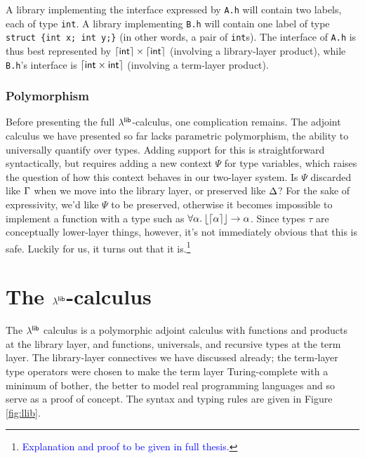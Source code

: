 \documentclass[11pt]{article}
\newcommand{\bscolor}{blue}
\newcommand{\bs}[1]{\textcolor{\bscolor}{#1}}
\begin{document}
A library implementing the interface expressed by \texttt{A.h} will contain two
labels, each of type \texttt{int}. A library implementing \texttt{B.h} will
contain one label of type \texttt{struct \{int x; int y;\}} (in other words, a
pair of \texttt{int}s). The interface of \texttt{A.h} is thus best represented
by $\lceil{\ensuremath{\textsf{int}}}\rceil \times \lceil{\ensuremath{\textsf{int}}}\rceil$ (involving a library-layer product), while
\texttt{B.h}'s interface is $\lceil{\ensuremath{\textsf{int}} \times\ensuremath{\textsf{int}}}\rceil$ (involving a term-layer
product).


\subsubsection{Polymorphism}

Before presenting the full $\lambda^{\textsf{lib}}$-calculus, one complication remains. The
adjoint calculus we have presented so far lacks parametric polymorphism, the
ability to universally quantify over types. Adding support for this is
straightforward syntactically, but requires adding a new context $\Psi$ for type
variables, which raises the question of how this context behaves in our
two-layer system. Is $\Psi$ discarded like $\Gamma$ when we move into the library
layer, or preserved like $\Delta$? For the sake of expressivity, we'd like $\Psi$ to
be preserved, otherwise it becomes impossible to implement a function with a
type such as $\forall \alpha .\: \lfloor{\lceil{\alpha}\rceil}\rfloor \to \alpha$. Since types $\tau$ are
conceptually lower-layer things, however, it's not immediately obvious that this
is safe. Luckily for us, it turns out that it is.\footnote{\bs{Explanation and
    proof to be given in full thesis.}}


\section{The $\lambda^{\textsf{lib}}$-calculus}

The $\lambda^{\textsf{lib}}$ calculus is a polymorphic adjoint calculus with functions and
products at the library layer, and functions, universals, and recursive types at
the term layer. The library-layer connectives we have discussed already; the
term-layer type operators were chosen to make the term layer Turing-complete
with a minimum of bother, the better to model real programming languages and so
serve as a proof of concept. The syntax and typing rules are given in Figure
\ref{fig:llib}.
\end{document}
